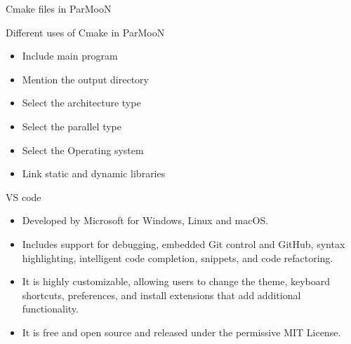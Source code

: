 \documentclass[xcolor=x11names,compress]{beamer}
\renewcommand{\(}{\begin{columns}}
\renewcommand{\)}{\end{columns}}
\newcommand{\<}[1]{\begin{column}{#1}}
\renewcommand{\>}{\end{column}}
\begin{document}
\begin{frame}{Cmake files in ParMooN}
	\newline 
\end{frame}

\begin{frame}{Different uses of Cmake in ParMooN}
	\begin{itemize}
		\item Include main program 
		\item Mention the output directory
		\item Select the architecture type
		\item Select the parallel type
		\item Select the Operating system
		\item Link static and dynamic libraries
	\end{itemize}
\end{frame}
\begin{frame}{VS code}
	\begin{itemize}
		\item Developed by Microsoft for Windows, Linux and macOS.
		\item Includes support for debugging, embedded Git control and GitHub, syntax highlighting, intelligent code completion, snippets, and code refactoring.
		\item It is highly customizable, allowing users to change the theme, keyboard shortcuts, preferences, and install extensions that add additional functionality. \item It is free and open source and released under the permissive MIT License.
	\end{itemize}
\end{frame}
\end{document}
